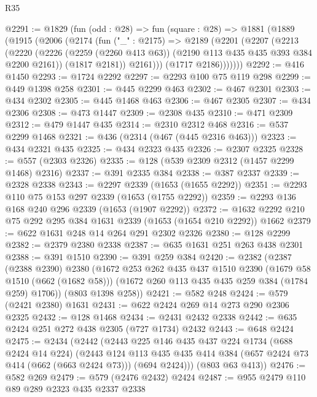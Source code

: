 \begin{lexlean}{R35}
\begin{coremodule}
@2291 := @1829
    (fun (odd : @28) =>
    fun (square : @28) =>
    @1881
      (@1889
        (@1915
          (@2006
            (@2174
              (fun ("_" : @2175) =>
              @2189
                (@2201
                  (@2207
                    (@2213
                      (@2220
                        (@2226
                          (@2259 (@2260 @413 @63))
                          (@2190 @113 @435 @435 @393 @384 @2200 @2161))
                        (@1817 @2181))
                      @2161)))
                (@1717 @2186)))))))
@2292 := @416 @1450
@2293 := @1724 @2292
@2297 := @2293 @100 @75 @119 @298
@2299 := @449 @1398 @258
@2301 := @445 @2299 @463
@2302 := @467 @2301
@2303 := @434 @2302
@2305 := @445 @1468 @463
@2306 := @467 @2305
@2307 := @434 @2306
@2308 := @473 @1447
@2309 := @2308 @435
@2310 := @471 @2309
@2312 := @479 @1447 @435
@2314 := @2310 @2312 @468
@2316 := @537 @2299 @1468
@2321 := @436 (@2314 (@467 (@445 @2316 @463)))
@2323 := @434 @2321 @435
@2325 := @434 @2323 @435
@2326 := @2307 @2325
@2328 := @557 (@2303 @2326)
@2335 := @128 (@539 @2309 @2312 (@1457 @2299 @1468) @2316)
@2337 := @391 @2335 @384
@2338 := @387 @2337
@2339 := @2328 @2338
@2343 := @2297 @2339 (@1653 (@1655 @2292))
@2351 := @2293 @110 @75 @153 @297 @2339 (@1653 (@1755 @2292))
@2359 := @2293 @136 @168 @240 @296 @2339 (@1653 (@1907 @2292))
@2372 := @1632 @2292 @210 @75 @292 @295 @384 @1631 @2339 (@1653 (@1654 @210 @2292)) @1662
@2379 := @622 @1631 @248 @14 @264 @291 @2302 @2326
@2380 := @128 @2299
@2382 := @2379 @2380 @2338
@2387 := @635 @1631 @251 @263 @438 @2301
@2388 := @391 @1510
@2390 := @391 @259 @384
@2420 := @2382
    (@2387
      (@2388 @2390)
      @2380
      (@1672
        @253
        @262
        @435
        @437
        @1510
        @2390
        (@1679 @58 @1510 (@662 (@1682 @58)))
        (@1672 @260 @113 @435 @435 @259 @384 (@1784 @259) @1706))
      (@803 @1398 @258))
@2421 := @582 @248
@2424 := @579 (@2421 @2380) @1631
@2431 := @622 @2424 @269 @14 @273 @290 @2306 @2325
@2432 := @128 @1468
@2434 := @2431 @2432 @2338
@2442 := @635 @2424 @251 @272 @438 @2305 (@727 @1734) @2432
@2443 := @648 @2424
@2475 := @2434
    (@2442
      (@2443
        @225
        @146
        @435
        @437
        @224
        @1734
        (@688 @2424 @14 @224)
        (@2443
          @124
          @113
          @435
          @435
          @414
          @384
          (@657 @2424 @73 @414 (@662 (@663 @2424 @73)))
          (@694 @2424)))
      (@803 @63 @413))
@2476 := @582 @269
@2479 := @579 (@2476 @2432) @2424
@2487 := @955 @2479 @110 @89 @289 @2323 @435 @2337 @2338

\end{coremodule}
\end{lexlean}
